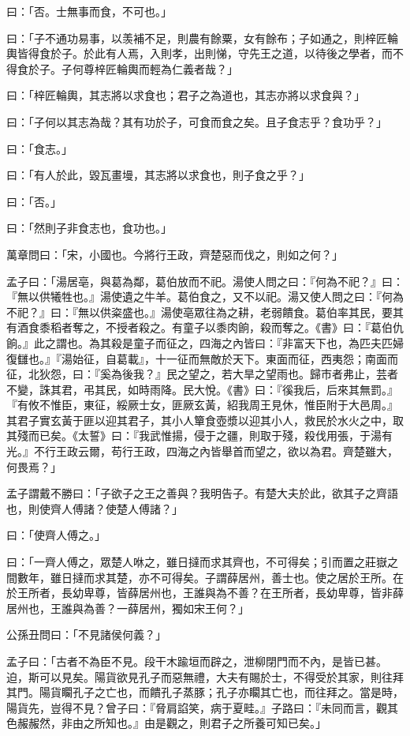 \documentclass[12pt,a4paper]{ctexbook}
\begin{document}
曰：「否。士無事而食，不可也。」\par
曰：「子不通功易事，以羡補不足，則農有餘粟，女有餘布；子如通之，則梓匠輪輿皆得食於子。於此有人焉，入則孝，出則悌，守先王之道，以待後之學者，而不得食於子。子何尊梓匠輪輿而輕為仁義者哉？」\par
曰：「梓匠輪輿，其志將以求食也；君子之為道也，其志亦將以求食與？」\par
曰：「子何以其志為哉？其有功於子，可食而食之矣。且子食志乎？食功乎？」\par
曰：「食志。」\par
曰：「有人於此，毀瓦畫墁，其志將以求食也，則子食之乎？」\par
曰：「否。」\par
曰：「然則子非食志也，食功也。」\par
萬章問曰：「宋，小國也。今將行王政，齊楚惡而伐之，則如之何？」\par
孟子曰：「湯居亳，與葛為鄰，葛伯放而不祀。湯使人問之曰：『何為不祀？』曰：『無以供犧牲也。』湯使遺之牛羊。葛伯食之，又不以祀。湯又使人問之曰：『何為不祀？』曰：『無以供粢盛也。』湯使亳眾往為之耕，老弱饋食。葛伯率其民，要其有酒食黍稻者奪之，不授者殺之。有童子以黍肉餉，殺而奪之。《書》曰：『葛伯仇餉。』此之謂也。為其殺是童子而征之，四海之內皆曰：『非富天下也，為匹夫匹婦復讎也。』『湯始征，自葛載』，十一征而無敵於天下。東面而征，西夷怨；南面而征，北狄怨，曰：『奚為後我？』民之望之，若大旱之望雨也。歸市者弗止，芸者不變，誅其君，弔其民，如時雨降。民大悅。《書》曰：『徯我后，后來其無罰。』『有攸不惟臣，東征，綏厥士女，匪厥玄黃，紹我周王見休，惟臣附于大邑周。』其君子實玄黃于匪以迎其君子，其小人簞食壺漿以迎其小人，救民於水火之中，取其殘而已矣。《太誓》曰：『我武惟揚，侵于之疆，則取于殘，殺伐用張，于湯有光。』不行王政云爾，苟行王政，四海之內皆舉首而望之，欲以為君。齊楚雖大，何畏焉？」\par
孟子謂戴不勝曰：「子欲子之王之善與？我明告子。有楚大夫於此，欲其子之齊語也，則使齊人傅諸？使楚人傅諸？」\par
曰：「使齊人傅之。」\par
曰：「一齊人傅之，眾楚人咻之，雖日撻而求其齊也，不可得矣；引而置之莊嶽之間數年，雖日撻而求其楚，亦不可得矣。子謂薛居州，善士也。使之居於王所。在於王所者，長幼卑尊，皆薛居州也，王誰與為不善？在王所者，長幼卑尊，皆非薛居州也，王誰與為善？一薛居州，獨如宋王何？」\par
公孫丑問曰：「不見諸侯何義？」\par
孟子曰：「古者不為臣不見。段干木踰垣而辟之，泄柳閉門而不內，是皆已甚。迫，斯可以見矣。陽貨欲見孔子而惡無禮，大夫有賜於士，不得受於其家，則往拜其門。陽貨矙孔子之亡也，而饋孔子蒸豚；孔子亦矙其亡也，而往拜之。當是時，陽貨先，豈得不見？曾子曰：『脅肩諂笑，病于夏畦。』子路曰：『未同而言，觀其色赧赧然，非由之所知也。』由是觀之，則君子之所養可知已矣。」\par
\end{document}
